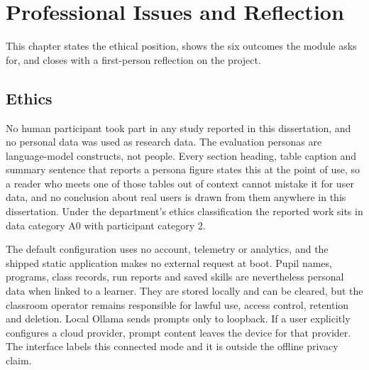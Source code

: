 \documentclass[11pt,a4paper]{report}
\newif\ifhumanfeedback
\newcommand{\ethicsroutenote}{The questionnaire and its inclusion in this report were agreed with my supervisor.}
\begin{document}
\chapter{Professional Issues and Reflection}
This chapter states the ethical position, shows the six outcomes the module asks for, and closes with a first-person reflection on the project.

\section{Ethics}
\ifhumanfeedback
The only human input reported in this dissertation is the anonymous volunteer questionnaire of Section~\ref{sec:volunteerfeedback}, which collected no name, email address or any other personal data and required no sign-in; respondents were adults and the form carried its consent statement on its face. \ethicsroutenote{} No other reported work involved human participants. The evaluation personas are language-model constructs, not people, and every section heading, table caption and summary sentence that reports a persona figure states this at the point of use, so a reader who meets one of those tables out of context cannot mistake it for user data. The synthetic and automated evaluation continues to sit in data category A0 with participant category 2.
\else
No human participant took part in any study reported in this dissertation, and no personal data was used as research data. The evaluation personas are language-model constructs, not people. Every section heading, table caption and summary sentence that reports a persona figure states this at the point of use, so a reader who meets one of those tables out of context cannot mistake it for user data, and no conclusion about real users is drawn from them anywhere in this dissertation. Under the department's ethics classification the reported work sits in data category A0 with participant category 2.
\fi

The default configuration uses no account, telemetry or analytics, and the shipped static application makes no external request at boot. Pupil names, programs, class records, run reports and saved skills are nevertheless personal data when linked to a learner. They are stored locally and can be cleared, but the classroom operator remains responsible for lawful use, access control, retention and deletion. Local Ollama sends prompts only to loopback. If a user explicitly configures a cloud provider, prompt content leaves the device for that provider. The interface labels this connected mode and it is outside the offline privacy claim.
\end{document}
